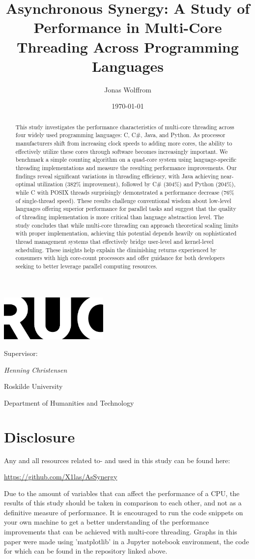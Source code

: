 \documentclass[12pt,a4paper]{article}
\title{Asynchronous Synergy: A Study of Performance in Multi-Core Threading Across Programming Languages}
\author{Jonas Wolffrom}
\date{\today}
\renewcommand{\maketitle}{
  \begin{titlepage}
    \centering
    \vspace*{1cm}
    
    \includegraphics[width=0.4\textwidth]{ruc_logo.png}\\[2cm]
    
    {\LARGE\bfseries\thetitle\par}
    \vspace{1.5cm}
    
    {\Large\theauthor\par}
    \vspace{1cm}
    {\large Supervisor: \par}
    {\large\textit{Henning Christensen}\par}   
    \vspace{1cm}
    
    {\large\thedate\par}
    \vfill
    
    {\large Roskilde University\par}
    {\large Department of Humanities and Technology\par}
    \vspace{0.5cm}
  \end{titlepage}
}
\begin{document}
\maketitle
\newpage

\begin{abstract}
This study investigates the performance characteristics of multi-core threading across four widely used programming languages: C, C\#, Java, and Python. As processor manufacturers shift from increasing clock speeds to adding more cores, the ability to effectively utilize these cores through software becomes increasingly important. We benchmark a simple counting algorithm on a quad-core system using language-specific threading implementations and measure the resulting performance improvements. Our findings reveal significant variations in threading efficiency, with Java achieving near-optimal utilization (382\% improvement), followed by C\# (304\%) and Python (204\%), while C with POSIX threads surprisingly demonstrated a performance decrease (76\% of single-thread speed). These results challenge conventional wisdom about low-level languages offering superior performance for parallel tasks and suggest that the quality of threading implementation is more critical than language abstraction level. The study concludes that while multi-core threading can approach theoretical scaling limits with proper implementation, achieving this potential depends heavily on sophisticated thread management systems that effectively bridge user-level and kernel-level scheduling. These insights help explain the diminishing returns experienced by consumers with high core-count processors and offer guidance for both developers seeking to better leverage parallel computing resources.
\end{abstract}
\newpage

\tableofcontents
\newpage

\section{Disclosure}

Any and all resources related to- and used in this study can be found here:

\begin{center}
    \href{https://github.com/X1las/AsSynergy}{https://github.com/X1las/AsSynergy}
\end{center}

Due to the amount of variables that can affect the performance of a CPU, the results of this study should be taken in comparison to each other, and not as a definitive measure of performance. It is encouraged to run the code snippets on your own machine to get a better understanding of the performance improvements that can be achieved with multi-core threading. Graphs in this paper were made using 'matplotlib' in a Jupyter notebook environment, the code for which can be found in the repository linked above.
\end{document}
